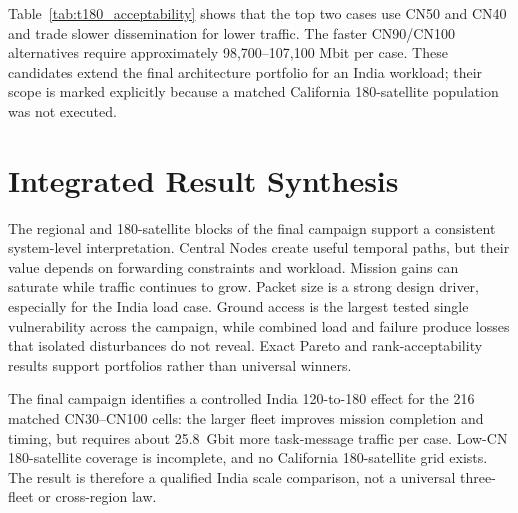 \begin{table}[htbp]
\centering
\scriptsize
\caption{Highest India 180-satellite rank-1 acceptability cases across 10,000 random family-weight vectors.}
\label{tab:t180_acceptability}
\end{table}

Table~\ref{tab:t180_acceptability} shows that the top two cases use CN50 and CN40 and trade slower dissemination for lower traffic. The faster CN90/CN100 alternatives require approximately 98,700--107,100 Mbit per case. These candidates extend the final architecture portfolio for an India workload; their scope is marked explicitly because a matched California 180-satellite population was not executed.

\section{Integrated Result Synthesis}

The regional and 180-satellite blocks of the final campaign support a consistent system-level interpretation. Central Nodes create useful temporal paths, but their value depends on forwarding constraints and workload. Mission gains can saturate while traffic continues to grow. Packet size is a strong design driver, especially for the India load case. Ground access is the largest tested single vulnerability across the campaign, while combined load and failure produce losses that isolated disturbances do not reveal. Exact Pareto and rank-acceptability results support portfolios rather than universal winners.

The final campaign identifies a controlled India 120-to-180 effect for the 216 matched CN30--CN100 cells: the larger fleet improves mission completion and timing, but requires about 25.8~Gbit more task-message traffic per case. Low-CN 180-satellite coverage is incomplete, and no California 180-satellite grid exists. The result is therefore a qualified India scale comparison, not a universal three-fleet or cross-region law.
